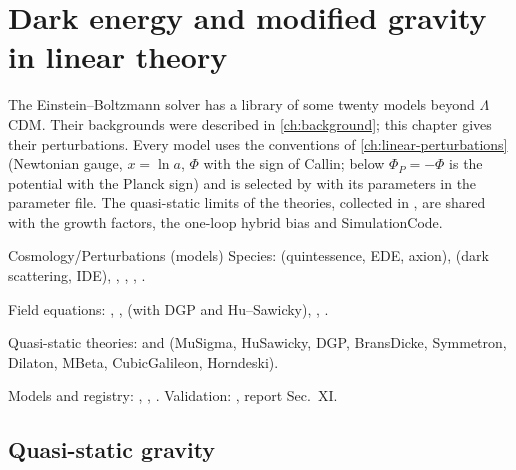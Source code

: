 \chapter{Dark energy and modified gravity in linear theory}\label{ch:extended-models}

The Einstein--Boltzmann solver has a library of some twenty models beyond $\Lambda$CDM. Their backgrounds were
described in \cref{ch:background}; this chapter gives their perturbations. Every model uses the conventions of
\cref{ch:linear-perturbations} (Newtonian gauge, $x=\ln a$, $\Phi$ with the sign of Callin; below
$\Phi_P=-\Phi$ is the potential with the Planck sign) and is selected by  with its parameters in
the parameter file. The quasi-static limits of the theories, collected in , are shared with the
growth factors, the one-loop hybrid bias and SimulationCode.

\begin{modulebox}{Cosmology/Perturbations (models)}
Species:  (quintessence, EDE, axion),  (dark
scattering, IDE), , , ,
.\par
Field equations: , ,  (with
DGP and Hu--Sawicky), , .\par
Quasi-static theories:  and  (MuSigma, HuSawicky,
DGP, BransDicke, Symmetron, Dilaton, MBeta, CubicGalileon, Horndeski).\par
Models and registry: , , .
Validation: , report Sec.~XI.
\end{modulebox}

\section{Quasi-static gravity}\label{sec:ext-quasistatic}


